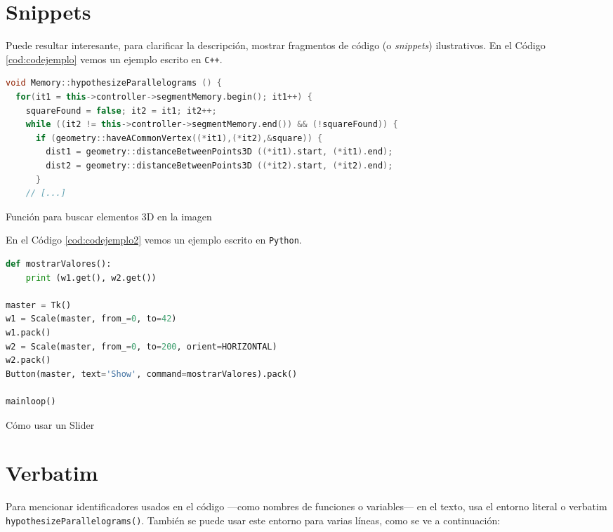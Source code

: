 \section{Snippets}

Puede resultar interesante, para clarificar la descripción, mostrar fragmentos de código (o \textit{snippets}) ilustrativos. En el Código \ref{cod:codejemplo} vemos un ejemplo escrito en \texttt{C++}.

\begin{code}[h]
	\begin{lstlisting}[language=C++]
void Memory::hypothesizeParallelograms () {
  for(it1 = this->controller->segmentMemory.begin(); it1++) {
    squareFound = false; it2 = it1; it2++;
    while ((it2 != this->controller->segmentMemory.end()) && (!squareFound)) {
      if (geometry::haveACommonVertex((*it1),(*it2),&square)) {
        dist1 = geometry::distanceBetweenPoints3D ((*it1).start, (*it1).end);
        dist2 = geometry::distanceBetweenPoints3D ((*it2).start, (*it2).end);
      }
    // [...]
\end{lstlisting}
	\caption[Función para buscar elementos 3D en la imagen]{Función para buscar elementos 3D en la imagen}
	\label{cod:codejemplo}
\end{code}

En el Código \ref{cod:codejemplo2} vemos un ejemplo escrito en \texttt{Python}.

\begin{code}[h]
	\begin{lstlisting}[language=Python]
def mostrarValores():
    print (w1.get(), w2.get())

master = Tk()
w1 = Scale(master, from_=0, to=42)
w1.pack()
w2 = Scale(master, from_=0, to=200, orient=HORIZONTAL)
w2.pack()
Button(master, text='Show', command=mostrarValores).pack()

mainloop()
\end{lstlisting}
	\caption[Cómo usar un Slider]{Cómo usar un Slider}
	\label{cod:codejemplo2}
\end{code}

\section{Verbatim}

Para mencionar identificadores usados en el código ---como nombres de funciones o variables--- en el texto, usa el entorno literal o verbatim \verb|hypothesizeParallelograms()|. También se puede usar este entorno para varias líneas, como se ve a continuación:

